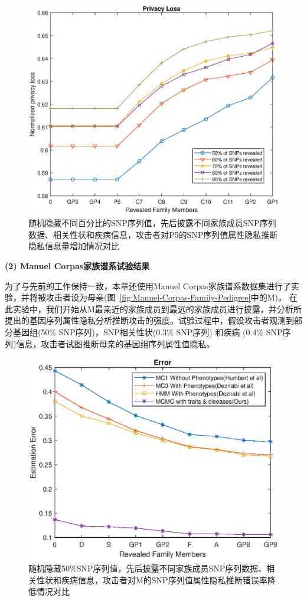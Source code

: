 \begin{figure}[htbp]
	\centering
	\includegraphics[width=0.8\linewidth]{./figures/P5privacyloss3.eps}
	\centering
	\caption{随机隐藏不同百分比的SNP序列值，先后披露不同家族成员SNP序列数据、相关性状和疾病信息，攻击者对P5的SNP序列值属性隐私推断隐私信息量增加情况对比}\label{fig:P5privacyloss3}
\end{figure}


\textbf{(2) Manuel Corpas家族谱系试验结果}

为了与先前的工作保持一致，本章还使用Manuel Corpas家族谱系数据集进行了实验，并将被攻击者设为母亲(图~\ref{fig:Manuel-Corpas-Family-Pedigree}中的M)。 在此实验中，我们开始从M最亲近的家族成员到最远的家族成员进行披露，并分析所提出的基因序列属性隐私分析推断攻击的强度。试验过程中，假设攻击者观测到部分基因组(50\% SNP序列)，SNP相关性状(0.3\% SNP序列) 和疾病 (0.4\% SNP序列)信息，攻击者试图推断母亲的基因组序列属性值隐私。

\begin{figure}[htbp]
	\centering
	\includegraphics[width=0.8\linewidth]{./figures/Merror1.eps}
	\centering
	\caption{随机隐藏50\%SNP序列值，先后披露不同家族成员SNP序列数据、相关性状和疾病信息，攻击者对M的SNP序列值属性隐私推断错误率降低情况对比}\label{fig:Merror1}
\end{figure}



